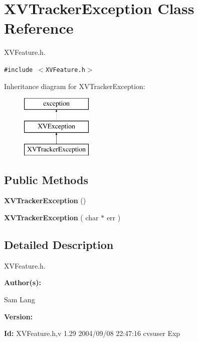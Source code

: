 \hypertarget{class_XVTrackerException}{
\section{XVTracker\-Exception  Class Reference}
\label{XVTrackerException}
}
XVFeature.h. 


{\tt \#include $<$XVFeature.h$>$}

Inheritance diagram for XVTracker\-Exception:\begin{figure}[H]
\begin{center}
\leavevmode
\includegraphics[height=3cm]{class_XVTrackerException}
\end{center}
\end{figure}
\subsection*{Public Methods}
\begin{CompactItemize}
\item 
{\bf XVTracker\-Exception} ()
\item 
{\bf XVTracker\-Exception} ( char $\ast$ err )
\end{CompactItemize}


\subsection{Detailed Description}
XVFeature.h.

\begin{Desc}
\item[{\bf Author(s): }]\par
 Sam Lang \end{Desc}
\begin{Desc}
\item[{\bf Version: }]\par
 \end{Desc}
\begin{Desc}
\item[{\bf Id: }] XVFeature.h,v 1.29 2004/09/08 22:47:16 cvsuser Exp \end{Desc}
 



